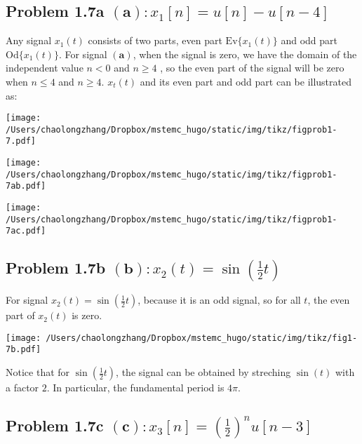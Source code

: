 \documentclass[koma,a4paper,utopia,12pt,listings-color,microtype,paralist,colorlinks,urlcolor=red]{org-article}
\begin{document}
\subsection{Problem 1.7a \(\mathbf{(a)}: x_{1}[n] = u[n] - u[n-4]\)}
\label{sec:orgcc2fcf2}

Any signal \(x_{1}(t)\) consists of two parts, even part \(\mathrm{Ev}
\{x_{1}(t)\}\) and odd part \(\mathrm{Od} \{ x_{1}(t)\}\). For signal \(\mathbf{(a)}\), when the signal is zero, we have the domain of the independent
value \(n< 0\) and \(n \geq 4\) , so the even part of the signal will be
zero when \(n\leq 4\) and \(n\geq 4\). \(x_{t}(t)\) and its even part and odd
part can be illustrated as:


\begin{center}
\texttt{[image: /Users/chaolongzhang/Dropbox/mstemc\_hugo/static/img/tikz/figprob1-7.pdf]}
\end{center}

\begin{center}
\texttt{[image: /Users/chaolongzhang/Dropbox/mstemc\_hugo/static/img/tikz/figprob1-7ab.pdf]}
\end{center}

\begin{center}
\texttt{[image: /Users/chaolongzhang/Dropbox/mstemc\_hugo/static/img/tikz/figprob1-7ac.pdf]}
\end{center}

\subsection{Problem 1.7b \(\mathbf{(b)}: x_{2}(t) = \sin(\tfrac{1}{2} t)\)}
\label{sec:orge473634}
For signal \(x_{2}(t) = \sin (\frac{1}{2} t)\), because it is an odd signal, so
for all \(t\), the even part of \(x_{2}(t)\) is zero.

\begin{center}
\texttt{[image: /Users/chaolongzhang/Dropbox/mstemc\_hugo/static/img/tikz/fig1-7b.pdf]}
\end{center}

Notice that for \(\sin(\frac{1}{2}t)\), the signal can be obtained by streching
\(\sin(t)\) with a factor \(2\). In particular, the fundamental period is \(4\pi\).

\subsection{Problem 1.7c \(\mathbf{(c)}: x_{3}[n] = ( \frac{1}{2} )^{n} u[n-3]\)}
\label{sec:orgbe754f7}
\end{document}
